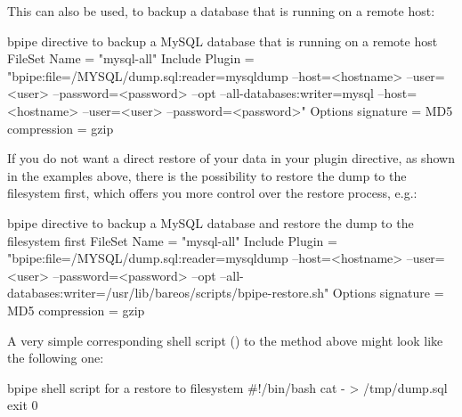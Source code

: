 This can also be used, to backup a database that is running on a remote host:
\begin{bconfig}{bpipe directive to backup a MySQL database that is running on a remote host}
FileSet{
  Name = "mysql-all"
  Include {
    Plugin = "bpipe:file=/MYSQL/dump.sql:reader=mysqldump --host=<hostname> --user=<user> --password=<password> --opt --all-databases:writer=mysql --host=<hostname> --user=<user> --password=<password>"
    Options {
      signature = MD5
      compression = gzip
    }
  }
}
\end{bconfig}

If you do not want a direct restore of your data in your plugin directive, as shown in the examples above, 
there is the possibility to restore the dump to the filesystem first, which offers you more control over the restore process, e.g.:
\begin{bconfig}{bpipe directive to backup a MySQL database and restore the dump to the filesystem first}
FileSet{
  Name = "mysql-all"
  Include {
    Plugin = "bpipe:file=/MYSQL/dump.sql:reader=mysqldump --host=<hostname> --user=<user> --password=<password> --opt --all-databases:writer=/usr/lib/bareos/scripts/bpipe-restore.sh"
    Options {
      signature = MD5
      compression = gzip
    }
  }
}
\end{bconfig}

A very simple corresponding shell script () to the method above might look like the following one:
\begin{bconfig}{bpipe shell script for a restore to filesystem}
#!/bin/bash
cat - > /tmp/dump.sql
exit 0
\end{bconfig}
